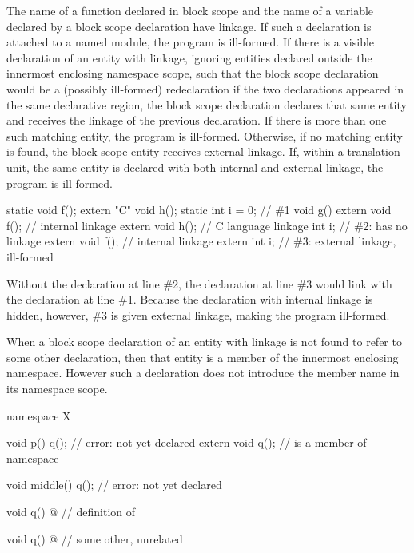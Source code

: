 \pnum
The name of a function declared in block scope and
the name of a variable declared by a block scope  declaration
have linkage.
If such a declaration is attached to a named module,
the program is ill-formed.
If there is a visible declaration
of an entity with linkage, ignoring entities declared
outside the innermost enclosing namespace scope,
such that the block scope declaration would be
a (possibly ill-formed) redeclaration
if the two declarations appeared in the same declarative region,
the block scope declaration declares
that same entity and receives the linkage of the previous declaration. If there is more
than one such matching entity, the program is ill-formed. Otherwise, if no matching
entity is found, the block scope entity receives external linkage.
If, within a translation unit, the same entity is declared with both
internal and external linkage, the program is ill-formed.
\begin{example}
\begin{codeblock}
static void f();
extern "C" void h();
static int i = 0;               // \#1
void g() {
  extern void f();              // internal linkage
  extern void h();              // C language linkage
  int i;                        // \#2:  has no linkage
  {
    extern void f();            // internal linkage
    extern int i;               // \#3: external linkage, ill-formed
  }
}
\end{codeblock}
Without the declaration at line \#2,
the declaration at line \#3 would link with the declaration at line \#1.
Because the declaration with internal linkage is hidden, however,
\#3 is given external linkage, making the program ill-formed.
\end{example}

\pnum
When a block scope declaration of an entity with linkage is not found to
refer to some other declaration, then that entity is a member of the
innermost enclosing namespace. However such a declaration does not
introduce the member name in its namespace scope.
\begin{example}
\begin{codeblock}
namespace X {
  void p() {
    q();                        // error:  not yet declared
    extern void q();            //  is a member of namespace 
  }

  void middle() {
    q();                        // error:  not yet declared
  }

  void q() { @\commentellip@ }        // definition of 
}

void q() { @\commentellip@ }          // some other, unrelated 
\end{codeblock}
\end{example}

